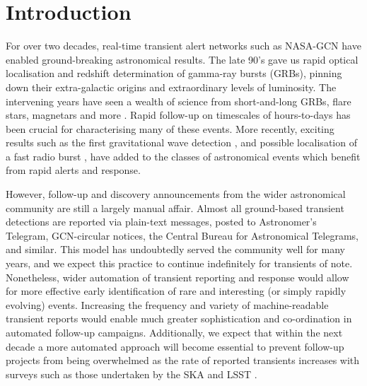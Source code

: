 \documentclass[5p,authoryear]{elsarticle}
\begin{document}
\section{Introduction}
\label{sec:intro}
For over two decades, real-time transient alert networks such as NASA-GCN have enabled ground-breaking astronomical results. 
The late 90's gave us rapid optical localisation and redshift determination of gamma-ray bursts (GRBs), pinning down their extra-galactic origins and extraordinary levels of luminosity. The intervening years have seen a wealth of science from short-and-long GRBs, flare stars, magnetars and more \citep[e.g.][]{Gehrels2015}. 
Rapid follow-up on timescales of hours-to-days has been crucial for characterising many of these events. 
More recently, exciting results such as the first gravitational wave detection \citep{Abbott2016}, and possible localisation of a fast radio burst \citep{Keane2016}, have added to the classes of astronomical events which benefit from rapid alerts and response.


However, follow-up and discovery announcements from the wider astronomical community are still 
a largely manual affair. 
Almost all ground-based transient detections are reported via plain-text messages, posted to
Astronomer's Telegram, GCN-circular notices, the Central Bureau for Astronomical Telegrams, and similar. 
This model has undoubtedly served the community well for many years, and we expect this practice to continue indefinitely for transients of note. 
Nonetheless, wider automation of transient reporting and response would allow for more effective early identification of rare and interesting (or simply rapidly evolving) events.
Increasing the frequency and variety of machine-readable transient reports would enable much greater sophistication and co-ordination in automated follow-up campaigns.
Additionally, we expect that within the next decade a more automated approach will become essential to prevent follow-up projects from being overwhelmed as the rate of reported transients increases
with surveys such as those undertaken by the SKA and LSST \citep{Fender2015a,LSST2009}.
\end{document}
